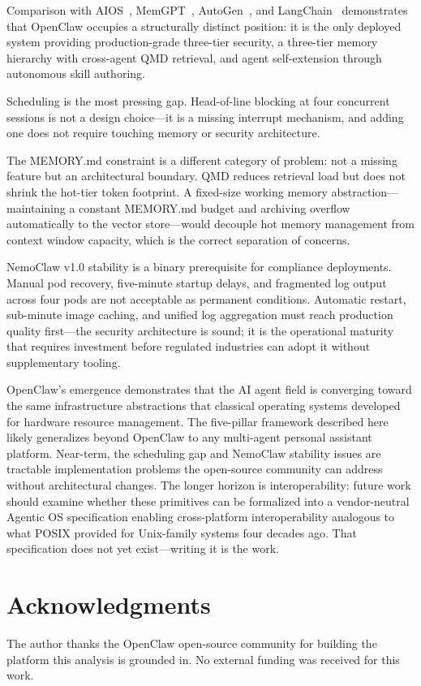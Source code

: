 \documentclass[journal]{IEEEtran}
\begin{document}
Comparison with AIOS~\cite{mei2024aios}, MemGPT~\cite{packer2023memgpt},
AutoGen~\cite{wu2023autogen}, and LangChain~\cite{chase2022langchain}
demonstrates that OpenClaw occupies a structurally distinct position: it is
the only deployed system providing production-grade three-tier security, a
three-tier memory hierarchy with cross-agent QMD retrieval, and agent
self-extension through autonomous skill authoring.

Scheduling is the most pressing gap. Head-of-line blocking at four
concurrent sessions is not a design choice---it is a missing interrupt
mechanism, and adding one does not require touching memory or security
architecture.

The MEMORY.md constraint is a different category of problem: not a missing
feature but an architectural boundary. QMD reduces retrieval load but does
not shrink the hot-tier token footprint. A fixed-size working memory
abstraction---maintaining a constant MEMORY.md budget and archiving
overflow automatically to the vector store---would decouple hot memory
management from context window capacity, which is the correct separation
of concerns.

NemoClaw v1.0 stability is a binary prerequisite for compliance
deployments. Manual pod recovery, five-minute startup delays, and
fragmented log output across four pods are not acceptable as permanent
conditions. Automatic restart, sub-minute image caching, and unified log
aggregation must reach production quality first---the security architecture
is sound; it is the operational maturity that requires investment before
regulated industries can adopt it without supplementary tooling.

OpenClaw's emergence demonstrates that the AI agent field is converging toward
the same infrastructure abstractions that classical operating systems developed
for hardware resource management. The five-pillar framework described here
likely generalizes beyond OpenClaw to any multi-agent personal assistant
platform. Near-term, the scheduling gap and NemoClaw stability issues are
tractable implementation problems the open-source community can address without
architectural changes. The longer horizon is interoperability: future work
should examine whether these primitives can be formalized into a vendor-neutral
Agentic OS specification enabling cross-platform interoperability analogous to
what POSIX provided for Unix-family systems four decades ago. That
specification does not yet exist---writing it is the work.

\section*{Acknowledgments}
The author thanks the OpenClaw open-source community for building the platform this analysis is grounded in. No external funding was received for this work.
\end{document}
